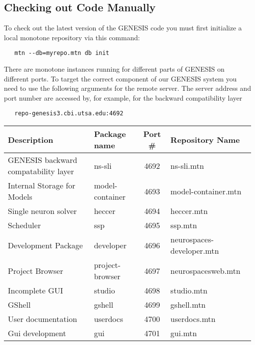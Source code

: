 \documentclass[12pt]{article}
\begin{document}
\subsection*{Checking out Code Manually}

To check out the latest version of the GENESIS code you must first initialize a local monotone repository via this command:
\begin{verbatim}
   mtn --db=myrepo.mtn db init 
\end{verbatim}
There are monotone instances running for different parts of GENESIS on different ports. To target the correct component of our GENESIS system you need to use the following arguments for the remote server. The server address and port number are accessed by, for example, for the backward compatibility layer
\begin{verbatim}
   repo-genesis3.cbi.utsa.edu:4692
\end{verbatim}

\vspace{3mm}
\begin{footnotesize}
\begin{centering}
\begin{tabular}{| l | l | c | l |}
\hline
{\bf Description}                                               & {\bf Package name}   & {\bf Port \#} & {\bf Repository Name} \\ \hline
GENESIS backward compatability layer    & ns-sli                             & 4692           & ns-sli.mtn \\ \hline
Internal Storage for Models                           & model-container        & 4693           & model-container.mtn \\ \hline
Single neuron solver                                      & heccer 	                        & 4694           & heccer.mtn \\ \hline
Scheduler                                                         & ssp                                & 4695           & ssp.mtn \\ \hline
Development Package                                  & developer                    & 4696           & neurospaces-developer.mtn \\ \hline
Project Browser                                               & project-browser          & 4697           & neurospacesweb.mtn \\ \hline
Incomplete GUI 	                                      & studio                            & 4698           & studio.mtn \\ \hline
GShell 	                                                         & gshell                            & 4699          & gshell.mtn \\ \hline
User documentation                                       & userdocs                      & 4700          & userdocs.mtn \\ \hline
Gui development                                             & gui                                 & 4701          & gui.mtn \\ \hline
\end{tabular}
\end{centering}
\end{footnotesize}
\end{document}
